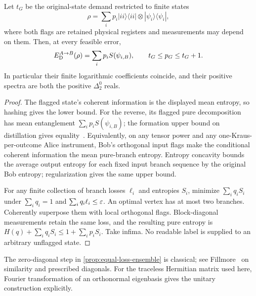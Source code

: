 \begin{proposition}\label{prop:flagged-pure-spectrum}
Let $t_G$ be the original-state demand restricted to finite states
\[
 \rho=\sum_i p_i|ii\rangle\langle ii|\otimes|\psi_i\rangle\langle\psi_i|,
\]
where both flags are retained physical registers and measurements may depend on them. Then, at every feasible error,
\[
 E_{\mathrm D}^{A\to B}(\rho)=\sum_i p_iS(\psi_{i,B}),\qquad t_G\le p_G\le t_G+1.
\]
In particular their finite logarithmic coefficients coincide, and their positive spectra are both the positive $\Delta^0_2$ reals.
\end{proposition}
\begin{proof}
The flagged state's coherent information is the displayed mean entropy, so hashing gives the lower bound. For the reverse, its flagged pure decomposition has mean entanglement $\sum_i p_iS(\psi_{i,B})$; the formation upper bound on distillation gives equality~\cite{BDSW96,DW05}. Equivalently, on any tensor power and any one-Kraus-per-outcome Alice instrument, Bob's orthogonal input flags make the conditional coherent information the mean pure-branch entropy. Entropy concavity bounds the average output entropy for each fixed input branch sequence by the original Bob entropy; regularization gives the same upper bound.

For any finite collection of branch losses $\ell_i$ and entropies $S_i$, minimize $\sum_iq_iS_i$ under $\sum_iq_i=1$ and $\sum_iq_i\ell_i\le\varepsilon$. An optimal vertex has at most two branches. Coherently superpose them with local orthogonal flags. Block-diagonal measurements retain the same loss, and the resulting pure entropy is $H(q)+\sum_iq_iS_i\le1+\sum_ip_iS_i$. Take infima. No readable label is supplied to an arbitrary unflagged state.
\end{proof}

The zero-diagonal step in \cref{prop:equal-loss-ensemble} is classical; see Fillmore~\cite{Fil69} on similarity and prescribed diagonals. For the traceless Hermitian matrix used here, Fourier transformation of an orthonormal eigenbasis gives the unitary construction explicitly.

